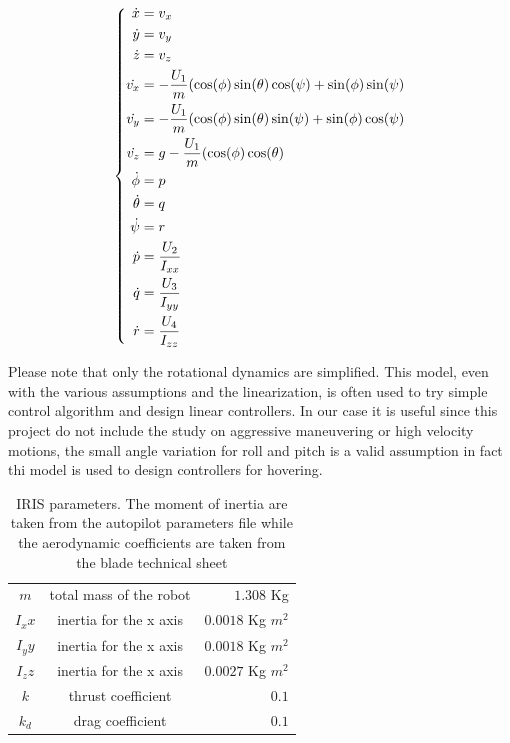 \vspace{2ex}
\begin{equation}
\vspace{2ex}
\left\lbrace
	\begin{aligned}
		\dot{x}& = v_x \\
		\dot{y}& = v_y \\
		\dot{z}& = v_z \\
		\dot{v_x}& = -\frac{U_1}{m}(\cos(\phi)\sin(\theta)\cos(\psi) + \sin(\phi)\sin(\psi) \\
		\dot{v_y}& = -\frac{U_1}{m}(\cos(\phi)\sin(\theta)\sin(\psi) + \sin(\phi)\cos(\psi) \\
		\dot{v_z}& = g - \frac{U_1}{m}(\cos(\phi)\cos(\theta) \\
        \dot{\phi}& = p \\
        \dot{\theta}& = q  \\
        \dot{\psi}& = r \\
        \dot{p}& =\frac{U_2}{I_{xx}} \\
        \dot{q}& =\frac{U_3}{I_{yy}} \\
        \dot{r}& =\frac{U_4}{I_{zz}} \\
     \end{aligned}
     \right.
\label{eq:mathlinlmodel}
\end{equation}

\noindent
Please note that only the rotational dynamics are simplified. This model, even with the various assumptions and the linearization, is often used to try simple control algorithm and design linear controllers. In our case it is useful since this project do not include the study on aggressive maneuvering or high velocity motions, the small angle variation for roll and pitch is a valid assumption in fact thi model is used to design controllers for hovering. 

\begin{table}[h]
\centering
\begin{tabular}{c c r}
\hline
$m$ & total mass of the robot & $1.308$ Kg \\
$I_xx$& inertia for the x axis& $0.0018$ Kg $m^2$ \\
$I_yy$& inertia for the x axis& $0.0018$ Kg $m^2$ \\
$I_zz$& inertia for the x axis& $0.0027$ Kg $m^2$ \\ \hline
$k$   & thrust coefficient & $0.1$ \\
$k_d$ & drag coefficient & $ 0.1$ \\
\end{tabular}
\caption{IRIS parameters. The moment of inertia are taken from the autopilot parameters file while the aerodynamic coefficients are taken from the blade technical sheet}
\end{table}















